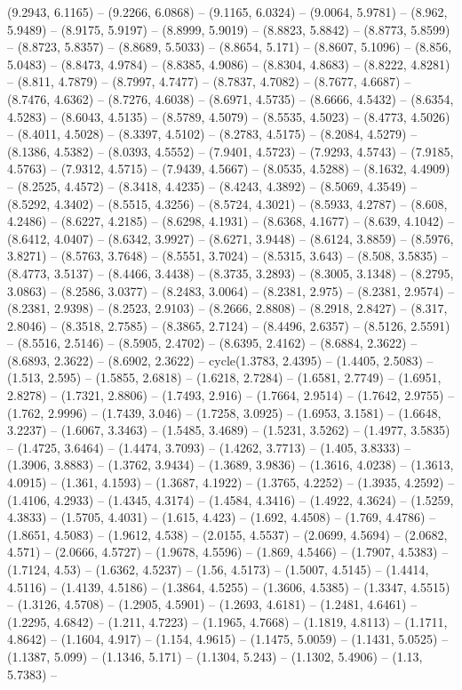 (9.2943, 6.1165) -- (9.2266, 6.0868) -- (9.1165, 6.0324) -- (9.0064, 5.9781) -- (8.962, 5.9489) -- (8.9175, 5.9197) -- (8.8999, 5.9019) -- (8.8823, 5.8842) -- (8.8773, 5.8599) -- (8.8723, 5.8357) -- (8.8689, 5.5033) -- (8.8654, 5.171) -- (8.8607, 5.1096) -- (8.856, 5.0483) -- (8.8473, 4.9784) -- (8.8385, 4.9086) -- (8.8304, 4.8683) -- (8.8222, 4.8281) -- (8.811, 4.7879) -- (8.7997, 4.7477) -- (8.7837, 4.7082) -- (8.7677, 4.6687) -- (8.7476, 4.6362) -- (8.7276, 4.6038) -- (8.6971, 4.5735) -- (8.6666, 4.5432) -- (8.6354, 4.5283) -- (8.6043, 4.5135) -- (8.5789, 4.5079) -- (8.5535, 4.5023) -- (8.4773, 4.5026) -- (8.4011, 4.5028) -- (8.3397, 4.5102) -- (8.2783, 4.5175) -- (8.2084, 4.5279) -- (8.1386, 4.5382) -- (8.0393, 4.5552) -- (7.9401, 4.5723) -- (7.9293, 4.5743) -- (7.9185, 4.5763) -- (7.9312, 4.5715) -- (7.9439, 4.5667) -- (8.0535, 4.5288) -- (8.1632, 4.4909) -- (8.2525, 4.4572) -- (8.3418, 4.4235) -- (8.4243, 4.3892) -- (8.5069, 4.3549) -- (8.5292, 4.3402) -- (8.5515, 4.3256) -- (8.5724, 4.3021) -- (8.5933, 4.2787) -- (8.608, 4.2486) -- (8.6227, 4.2185) -- (8.6298, 4.1931) -- (8.6368, 4.1677) -- (8.639, 4.1042) -- (8.6412, 4.0407) -- (8.6342, 3.9927) -- (8.6271, 3.9448) -- (8.6124, 3.8859) -- (8.5976, 3.8271) -- (8.5763, 3.7648) -- (8.5551, 3.7024) -- (8.5315, 3.643) -- (8.508, 3.5835) -- (8.4773, 3.5137) -- (8.4466, 3.4438) -- (8.3735, 3.2893) -- (8.3005, 3.1348) -- (8.2795, 3.0863) -- (8.2586, 3.0377) -- (8.2483, 3.0064) -- (8.2381, 2.975) -- (8.2381, 2.9574) -- (8.2381, 2.9398) -- (8.2523, 2.9103) -- (8.2666, 2.8808) -- (8.2918, 2.8427) -- (8.317, 2.8046) -- (8.3518, 2.7585) -- (8.3865, 2.7124) -- (8.4496, 2.6357) -- (8.5126, 2.5591) -- (8.5516, 2.5146) -- (8.5905, 2.4702) -- (8.6395, 2.4162) -- (8.6884, 2.3622) -- (8.6893, 2.3622) -- (8.6902, 2.3622) -- cycle(1.3783, 2.4395) -- (1.4405, 2.5083) -- (1.513, 2.595) -- (1.5855, 2.6818) -- (1.6218, 2.7284) -- (1.6581, 2.7749) -- (1.6951, 2.8278) -- (1.7321, 2.8806) -- (1.7493, 2.916) -- (1.7664, 2.9514) -- (1.7642, 2.9755) -- (1.762, 2.9996) -- (1.7439, 3.046) -- (1.7258, 3.0925) -- (1.6953, 3.1581) -- (1.6648, 3.2237) -- (1.6067, 3.3463) -- (1.5485, 3.4689) -- (1.5231, 3.5262) -- (1.4977, 3.5835) -- (1.4725, 3.6464) -- (1.4474, 3.7093) -- (1.4262, 3.7713) -- (1.405, 3.8333) -- (1.3906, 3.8883) -- (1.3762, 3.9434) -- (1.3689, 3.9836) -- (1.3616, 4.0238) -- (1.3613, 4.0915) -- (1.361, 4.1593) -- (1.3687, 4.1922) -- (1.3765, 4.2252) -- (1.3935, 4.2592) -- (1.4106, 4.2933) -- (1.4345, 4.3174) -- (1.4584, 4.3416) -- (1.4922, 4.3624) -- (1.5259, 4.3833) -- (1.5705, 4.4031) -- (1.615, 4.423) -- (1.692, 4.4508) -- (1.769, 4.4786) -- (1.8651, 4.5083) -- (1.9612, 4.538) -- (2.0155, 4.5537) -- (2.0699, 4.5694) -- (2.0682, 4.571) -- (2.0666, 4.5727) -- (1.9678, 4.5596) -- (1.869, 4.5466) -- (1.7907, 4.5383) -- (1.7124, 4.53) -- (1.6362, 4.5237) -- (1.56, 4.5173) -- (1.5007, 4.5145) -- (1.4414, 4.5116) -- (1.4139, 4.5186) -- (1.3864, 4.5255) -- (1.3606, 4.5385) -- (1.3347, 4.5515) -- (1.3126, 4.5708) -- (1.2905, 4.5901) -- (1.2693, 4.6181) -- (1.2481, 4.6461) -- (1.2295, 4.6842) -- (1.211, 4.7223) -- (1.1965, 4.7668) -- (1.1819, 4.8113) -- (1.1711, 4.8642) -- (1.1604, 4.917) -- (1.154, 4.9615) -- (1.1475, 5.0059) -- (1.1431, 5.0525) -- (1.1387, 5.099) -- (1.1346, 5.171) -- (1.1304, 5.243) -- (1.1302, 5.4906) -- (1.13, 5.7383) -- 